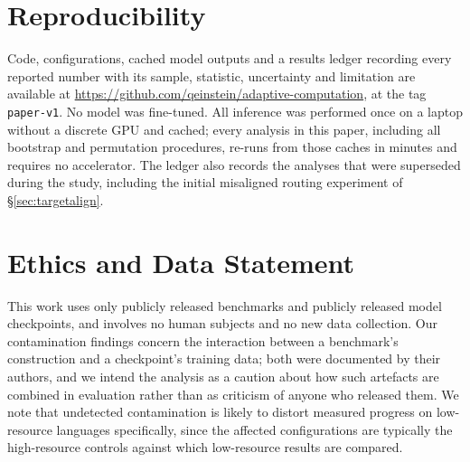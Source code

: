 \documentclass[11pt]{article}
\begin{document}
\section*{Reproducibility}
Code, configurations, cached model outputs and a results ledger recording every
reported number with its sample, statistic, uncertainty and limitation are
available at \url{https://github.com/qeinstein/adaptive-computation}, at the tag
\texttt{paper-v1}. No model was
fine-tuned. All inference was performed once on a laptop without a discrete GPU and
cached; every analysis in this paper, including all bootstrap and permutation
procedures, re-runs from those caches in minutes and requires no accelerator. The
ledger also records the analyses that were superseded during the study, including
the initial misaligned routing experiment of \S\ref{sec:targetalign}.

\section*{Ethics and Data Statement}
This work uses only publicly released benchmarks and publicly released model
checkpoints, and involves no human subjects and no new data collection. Our
contamination findings concern the interaction between a benchmark's construction
and a checkpoint's training data; both were documented by their authors, and we
intend the analysis as a caution about how such artefacts are combined in
evaluation rather than as criticism of anyone who released them. We note that
undetected contamination is likely to distort measured progress on low-resource
languages specifically, since the affected configurations are typically the
high-resource controls against which low-resource results are compared.
\end{document}
